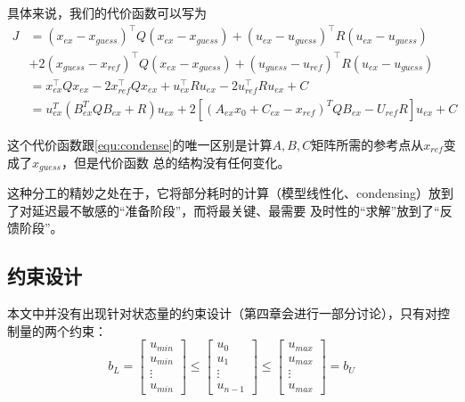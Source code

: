 具体来说，我们的代价函数可以写为\cite{Gros_2020}
\begin{equation} \label{equ:RTI}
    \begin{aligned}
        J &= (x_{ex} - x_{guess})^\top Q (x_{ex} - x_{guess}) + (u_{ex} - u_{guess})^\top R (u_{ex} - u_{guess}) \\
        &+ 2 (x_{guess} - x_{ref})^\top Q (x_{ex} - x_{guess}) + (u_{guess} - u_{ref})^\top R (u_{ex} - u_{guess}) \\
        &= x_{ex}^\top Q x_{ex} - 2 x_{ref}^\top Q x_{ex} + u_{ex}^\top R u_{ex} - 2 u_{ref}^\top R u_{ex} + C \\
        &= u_{ex}^T(B_{ex}^TQB_{ex}+R)u_{ex}+2\left[(A_{ex}x_0+ C_{ex}-x_{ref})^TQB_{ex}-U_{ref}R\right]u_{ex} + C
    \end{aligned}
\end{equation}

这个代价函数跟\autoref{equ:condense}的唯一区别是计算$A, B, C$矩阵所需的参考点从$x_{ref}$变成了$x_{guess}$，但是代价函数
总的结构没有任何变化。

这种分工的精妙之处在于，它将部分耗时的计算（模型线性化、condensing）放到了对延迟最不敏感的“准备阶段”，而将最关键、最需要
及时性的“求解”放到了“反馈阶段”。

\subsection{约束设计}

本文中并没有出现针对状态量的约束设计（第四章会进行一部分讨论），只有对控制量的两个约束：
\begin{equation}
    b_L = 
    \begin{bmatrix}
        u_{min} \\ u_{min}\\\vdots \\u_{min}
    \end{bmatrix} 
    \leq 
    \begin{bmatrix}u_{0} \\ u_{1}\\\vdots \\u_{n-1}
    \end{bmatrix} 
    \leq 
    \begin{bmatrix}u_{max} \\ u_{max}\\\vdots \\u_{max}
    \end{bmatrix} = b_U
\end{equation}

